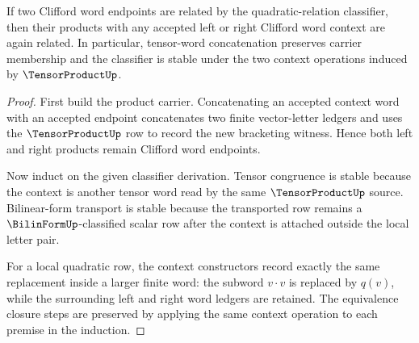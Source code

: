 \begin{theorem}\label{thm:clifford-product-relation-stability-obligations}
If two Clifford word endpoints are related by the quadratic-relation
classifier, then their products with any accepted left or right Clifford word
context are again related. In particular, tensor-word concatenation preserves
carrier membership and the classifier is stable under the two context
operations induced by $\TensorProductUp$.
\end{theorem}
\begin{proof}
First build the product carrier. Concatenating an accepted context word with
an accepted endpoint concatenates two finite vector-letter ledgers and uses
the $\TensorProductUp$ row to record the new bracketing witness. Hence both
left and right products remain Clifford word endpoints.

Now induct on the given classifier derivation. Tensor congruence is stable
because the context is another tensor word read by the same $\TensorProductUp$ source.
Bilinear-form transport is stable because the transported row remains a
$\BilinFormUp$-classified scalar row after the context is attached outside the local
letter pair.

For a local quadratic row, the context constructors record exactly the same
replacement inside a larger finite word: the subword $v \cdot v$ is replaced
by $q(v)$, while the surrounding left and right word ledgers are retained.
The equivalence closure steps are preserved by applying the same context
operation to each premise in the induction.
\end{proof}

